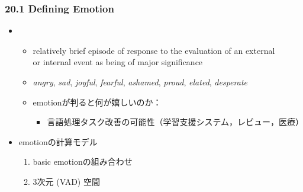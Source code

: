 \newcommand{\ulc}[2]{\textcolor[RGB]{#1}{\underline{\textcolor{black}{#2}}}}

\begin{frame}
    \frametitle{20.1 Defining Emotion}
    \begin{itemize}
        \item {}
        \begin{itemize}
            \item relatively brief episode of response to the evaluation of an external \\
                or internal event as being of major significance 
            \item \textit{angry}, \textit{sad}, \textit{joyful}, \textit{fearful}, \textit{ashamed}, \textit{proud}, \textit{elated}, \textit{desperate}
            \item emotionが判ると何が嬉しいのか：
            \begin{itemize}
                \item 言語処理タスク改善の可能性（学習支援システム，レビュー，医療）
            \end{itemize}
        \end{itemize}
    \end{itemize}
    \begin{itemize}
        \item emotionの計算モデル
        \begin{enumerate}
            \item basic emotionの組み合わせ
            \item 3次元 (VAD) 空間
        \end{enumerate}
    \end{itemize}
\end{frame}


